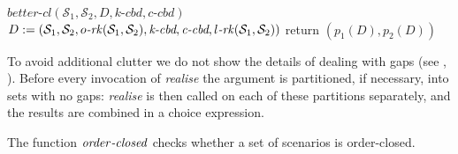 \begin{function}[!t]
{{       $\textit{better-cl}(\mathcal{S}_1,\mathcal{S}_2,D,\textit{k-cbd},\textit{c-cbd})$
}
                     {
       $D := (\mathcal{S}_1,\mathcal{S}_2,o\emph{-}\mathit{rk}(\mathcal{S}_1,\mathcal{S}_2),\emph{k-cbd},\emph{c-cbd},l\emph{-}\mathit{rk}(\mathcal{S}_1,\mathcal{S}_2))$\;
       }
                   }
                   return $(p_1(D), p_2(D))$\;
\caption{partition-const(a set of scenarios $\mathcal{S}$)}
\label{algo-partition-const}
\end{function}
\noindent
To avoid additional clutter we do not show the details of dealing with gaps
(see , ). Before every
invocation of \emph{realise} the argument is partitioned, if necessary,
into sets with no gaps: \emph{realise} is then called on
each of these partitions separately, and the results are combined in a
choice expression.

The function $\mathit{order}\emph{-}\mathit{closed}$
checks whether a set of scenarios is order-closed.

